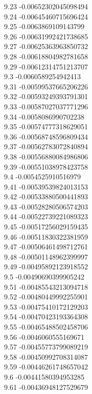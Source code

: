 {9.23	-0.00652302045098494\\
9.24	-0.00645460715696424\\
9.25	-0.0063869109143799\\
9.26	-0.00631992421738685\\
9.27	-0.00625363963850732\\
9.28	-0.00618804982781658\\
9.29	-0.00612314751213707\\
9.3	-0.0060589254942413\\
9.31	-0.00599537665206226\\
9.32	-0.00593249393791301\\
9.33	-0.00587027037771296\\
9.34	-0.0058086990702238\\
9.35	-0.00574777318629051\\
9.36	-0.00568748596809434\\
9.37	-0.00562783072840894\\
9.38	-0.00556880084986806\\
9.39	-0.00551038978423758\\
9.4	-0.0054525910516979\\
9.41	-0.00539539824013153\\
9.42	-0.00533880500441893\\
9.43	-0.00528280506574203\\
9.44	-0.00522739221089323\\
9.45	-0.00517256029159435\\
9.46	-0.00511830322381959\\
9.47	-0.00506461498712761\\
9.48	-0.00501148962399997\\
9.49	-0.00495892123918552\\
9.5	-0.00490690399905242\\
9.51	-0.00485543213094718\\
9.52	-0.00480449992255901\\
9.53	-0.00475410172129203\\
9.54	-0.00470423193364308\\
9.55	-0.00465488502458706\\
9.56	-0.0046060555169671\\
9.57	-0.00455773799089219\\
9.58	-0.00450992708314087\\
9.59	-0.00446261748657042\\
9.6	-0.00441580394953285\\
9.61	-0.00436948127529679\\
}
